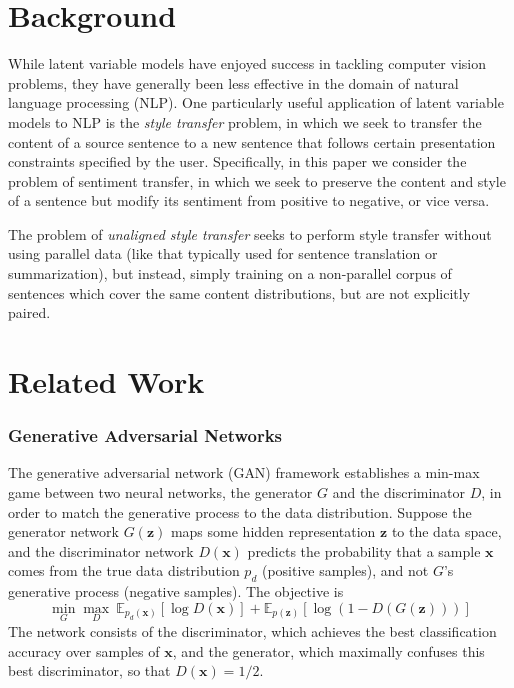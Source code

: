 \documentclass{article}
\newcommand{\vect}[1]{\boldsymbol{#1}}
\newcommand{\E}{\mathbb{E}}
\begin{document}
\section{Background}
While latent variable models have enjoyed success in tackling computer vision problems, they have generally been less effective in the domain of natural language processing (NLP).  One particularly useful application of latent variable models to NLP is the \emph{style transfer} problem, in which we seek to transfer the content
of a source sentence to a new sentence that follows certain presentation constraints specified by the user. Specifically, in this paper we consider the problem of sentiment transfer, in which we seek to preserve the content and style of a sentence but modify its sentiment from positive to negative, or vice versa.

The problem of \emph{unaligned style transfer} seeks to perform style transfer without using parallel data (like that typically used for sentence translation or summarization), but instead, simply training on a non-parallel corpus of sentences which cover the same content distributions, but are not explicitly paired.


\section{Related Work}

\subsubsection{Generative Adversarial Networks} \label{sssec:gan}
The generative adversarial network (GAN) \cite{gan} framework establishes a min-max game between two neural networks, the generator $G$ and the discriminator $D$, in order to match the generative process to the data distribution. Suppose the generator network $G(\vect{z})$ maps some hidden representation $\vect{z}$ to the data space, and the discriminator network $D(\vect{x})$ predicts the probability that a sample $\vect{x}$ comes from the true data distribution $p_d$ (positive samples), and not $G$'s generative process (negative samples). The objective is
\begin{equation}
\min_G \max_D \ \E_{p_d(\vect{x})} [\log D(\vect{x})] + \E_{p(\vect{z})} [\log (1 - D(G(\vect{z})))]
\end{equation}
The network consists of the discriminator, which achieves the best classification accuracy over samples of $\vect{x}$, and the generator, which maximally confuses this best discriminator, so that $D(\vect{x}) = 1/2$.
\end{document}
